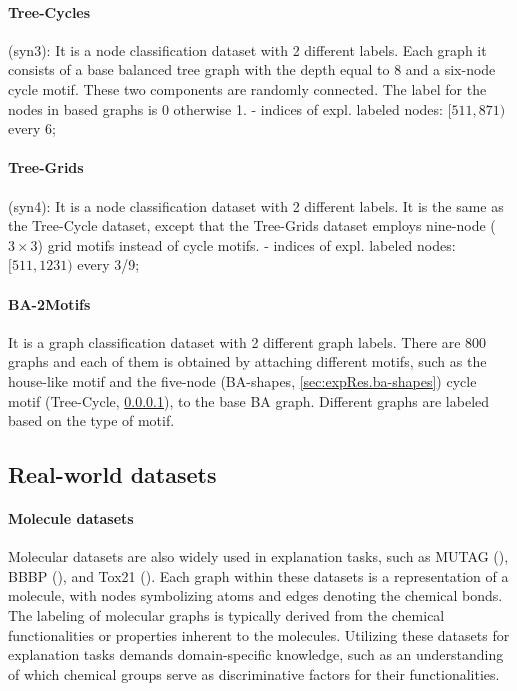 \documentclass[binding=0.6cm]{sapthesis}
\newcommand{\mycite}[1]{(\cite{#1})}
\begin{document}
\paragraph{Tree-Cycles}
\label{sec:expRes.tree-cycles}
(syn3): It is a node classification dataset with 2 different labels. Each graph it consists of a base balanced tree graph with the depth equal to 8 and a six-node cycle motif. These two components are randomly connected. The label for the nodes in based graphs is 0 otherwise 1.
- indices of expl. labeled nodes: $[511,871)$ every 6;

\paragraph{Tree-Grids}
\label{sec:expRes.tree-grids}
(syn4):  It is a node classification dataset with 2 different labels. It is the same as the Tree-Cycle dataset, except that the Tree-Grids dataset employs nine-node ($3\times 3$) grid motifs instead of cycle motifs.
- indices of expl. labeled nodes: $[511,1231)$ every 3/9;

\paragraph{BA-2Motifs}
\label{sec:expRes.ba-2motifs}
It is a graph classification dataset with 2 different graph labels. There are 800 graphs and each of them is obtained by attaching different motifs, such as the house-like motif and the five-node (BA-shapes, \cref{sec:expRes.ba-shapes}) cycle motif (Tree-Cycle, \cref{sec:expRes.tree-cycles}), to the base BA graph. Different graphs are labeled based on the type of motif.

\subsection{Real-world datasets}
\label{sec:expRes.real-dataset}

\paragraph{Molecule datasets}
\label{sec:expRes.mutag}
Molecular datasets are also widely used in explanation tasks, such as MUTAG \mycite{debnath1991-mutag}, BBBP \mycite{martins2012-BBBP}, and Tox21 \mycite{wu2018-moleculenet}. Each graph within these datasets is a representation of a molecule, with nodes symbolizing atoms and edges denoting the chemical bonds. The labeling of molecular graphs is typically derived from the chemical functionalities or properties inherent to the molecules. Utilizing these datasets for explanation tasks demands domain-specific knowledge, such as an understanding of which chemical groups serve as discriminative factors for their functionalities.
\end{document}
